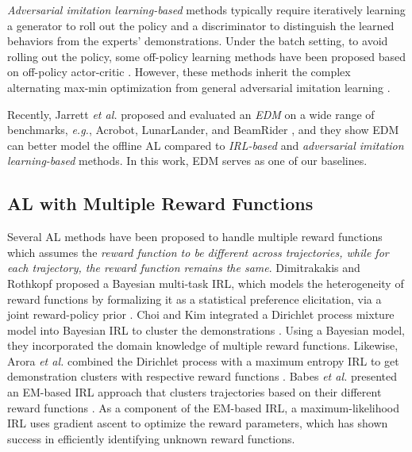 \documentclass{article}
\begin{document}
\emph{Adversarial imitation learning-based} methods typically require iteratively learning a generator to roll out the policy and a discriminator to distinguish the learned behaviors from the experts' demonstrations. Under the batch setting, to avoid rolling out the policy, some off-policy learning methods have been proposed based on off-policy actor-critic \cite{kostrikov2018discriminator,kostrikov2019imitation}. However, these methods inherit the complex alternating max-min optimization from general adversarial imitation learning \cite{ho2016generative}. 

Recently, Jarrett \textit{et al.} proposed and evaluated an \emph{EDM} \cite{jarrett2020strictly} on a wide range of benchmarks, \textit{e.g.}, Acrobot, LunarLander, and BeamRider \cite{brockman2016openai}, and they show  EDM can better model the offline AL compared to \emph{IRL-based} and \emph{adversarial imitation learning-based} methods. In this work, EDM serves as one of our baselines.


\subsection{AL with Multiple Reward Functions}

Several AL methods have been proposed to handle multiple reward functions which assumes the \emph{reward function to be different across trajectories, while for each trajectory, the reward function remains the same}. Dimitrakakis and Rothkopf proposed a Bayesian multi-task IRL, which models the heterogeneity of reward functions by formalizing it as a statistical preference elicitation, via a joint reward-policy prior \cite{dimitrakakis2011bayesian}. Choi and Kim integrated a Dirichlet process mixture model into Bayesian IRL to cluster the demonstrations \cite{choi2012nonparametric}. Using a Bayesian model, they incorporated the domain knowledge of multiple reward functions. Likewise, Arora \textit{et al.} combined the Dirichlet process with a maximum entropy IRL to get demonstration clusters with respective reward functions \cite{arora2021min}. Babes \textit{et al.} presented an EM-based IRL approach that clusters trajectories based on their different reward functions \cite{babes2011apprenticeship}. As a component of the EM-based IRL, a maximum-likelihood IRL uses gradient ascent to optimize the reward parameters, which has shown success in efficiently identifying unknown reward functions.
\end{document}
